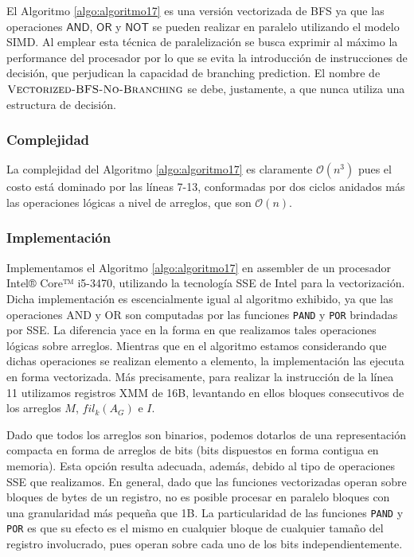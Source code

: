 El Algoritmo \ref{algo:algoritmo17} es una versión vectorizada de BFS ya que las operaciones $\textsf{AND}$, $\textsf{OR}$ y $\textsf{NOT}$ se pueden realizar en paralelo utilizando el modelo SIMD. Al emplear esta técnica de paralelización se busca exprimir al máximo la performance del procesador por lo que se evita la introducción de instrucciones de decisión, que perjudican la capacidad de branching prediction. El nombre de $\textsc{Vectorized-BFS-No-Branching}$ se debe, justamente, a que nunca utiliza una estructura de decisión.

\subsubsection{Complejidad}
La complejidad del Algoritmo \ref{algo:algoritmo17} es claramente $\mathcal{O}(n^3)$ pues el costo está dominado por las líneas 7-13, conformadas por dos ciclos anidados más las operaciones lógicas a nivel de arreglos, que son $\mathcal{O}(n)$.

\subsubsection{Implementación}
Implementamos el Algoritmo \ref{algo:algoritmo17} en assembler de un procesador Intel® Core™ i5-3470, utilizando la tecnología SSE de Intel para la vectorización. Dicha implementación es escencialmente igual al algoritmo exhibido, ya que las operaciones \textsf{AND} y \textsf{OR} son computadas por las funciones \texttt{PAND} y \texttt{POR} brindadas por SSE. La diferencia yace en la forma en que realizamos tales operaciones lógicas sobre arreglos. Mientras que en el algoritmo estamos considerando que dichas operaciones se realizan elemento a elemento, la implementación las ejecuta en forma vectorizada. Más precisamente, para realizar la instrucción de la línea 11 utilizamos registros XMM de 16B, levantando en ellos bloques consecutivos de los arreglos $M$, $fil_k(A_G)$ e $I$.

Dado que todos los arreglos son binarios, podemos dotarlos de una representación compacta en forma de arreglos de bits (bits dispuestos en forma contigua en memoria). Esta opción resulta adecuada, además, debido al tipo de operaciones SSE que realizamos. En general, dado que las funciones vectorizadas operan sobre bloques de bytes de un registro, no es posible procesar en paralelo bloques con una granularidad más pequeña que 1B. La particularidad de las funciones \texttt{PAND} y \texttt{POR} es que su efecto es el mismo en cualquier bloque de cualquier tamaño del registro involucrado, pues operan sobre cada uno de los bits independientemente.

